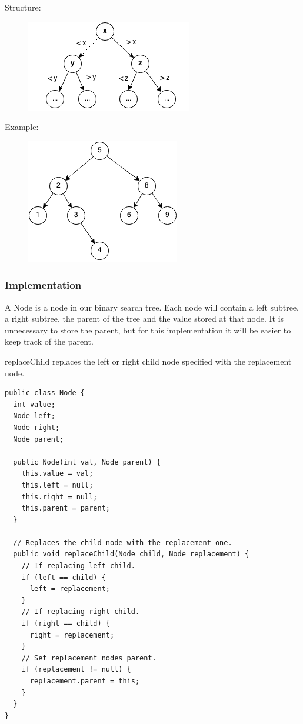\documentclass[11pt,oneside]{book}
\makeatletter
\def\maxwidth#1{\ifdim\Gin@nat@width>#1 #1\else\Gin@nat@width\fi}
\makeatother
\begin{document}
Structure:

\vspace{5px}\begin{figure}[H]\centering
        \includegraphics[width=0.66\maxwidth{\textwidth}]{bstcompare.png}
        \end{figure}

Example:

\vspace{5px}\begin{figure}[H]\centering
        \includegraphics[width=0.66\maxwidth{\textwidth}]{bst.png}
        \end{figure}

\subsubsection{Implementation}

A Node is a node in our binary search tree. Each node will contain a left subtree, a right subtree, the parent of the tree and the value stored at that node. It is unnecessary to store the parent, but for this implementation it will be easier to keep track of the parent.

replaceChild replaces the left or right child node specified with the replacement node.

\begin{lstlisting}
public class Node {
  int value;
  Node left;
  Node right;
  Node parent;

  public Node(int val, Node parent) {
    this.value = val;
    this.left = null;
    this.right = null;
    this.parent = parent;
  }

  // Replaces the child node with the replacement one.
  public void replaceChild(Node child, Node replacement) {
    // If replacing left child.
    if (left == child) {
      left = replacement;
    }
    // If replacing right child.
    if (right == child) {
      right = replacement;
    }
    // Set replacement nodes parent.
    if (replacement != null) {
      replacement.parent = this;
    }
  }
}
\end{lstlisting}
\end{document}
